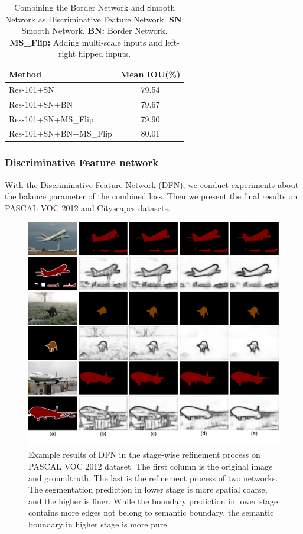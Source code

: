 \documentclass[10pt,twocolumn,letterpaper]{article}
\begin{document}
\begin{table}[t]
\begin{center}
\caption{Combining the Border Network and Smooth Network as Discriminative Feature Network. \textbf{SN}: Smooth Network. \textbf{BN:} Border Network. \textbf{MS\_Flip:} Adding multi-scale inputs and left-right flipped inputs.}
\label{tab:bn}
\begin{tabular}{lc}
\toprule
Method & Mean IOU(\%)\\
\hline
\noalign{\smallskip}
Res-101+SN & 79.54\\
Res-101+SN+BN & 79.67\\
\hline
\noalign{\smallskip}
Res-101+SN+MS\_Flip & 79.90\\
Res-101+SN+BN+MS\_Flip & 80.01\\
\bottomrule
\end{tabular}
\end{center}
\end{table}

\subsubsection{Discriminative Feature network}
With the Discriminative Feature Network (DFN), we conduct experiments about the balance parameter of the combined loss. Then we present the final results on PASCAL VOC 2012 and Cityscapes datasets.

\begin{figure}[t]
	\centering
	\includegraphics[width=\linewidth]{refine.pdf}
	\caption{Example results of DFN in the stage-wise refinement process on PASCAL VOC 2012 dataset. The first column is the original image and groundtruth. The last is the refinement process of two networks. The segmentation prediction in lower stage is more spatial coarse, and the higher is finer.  While the boundary prediction in lower stage contains more edges not belong to semantic boundary, the semantic boundary in higher stage is more pure.}
	\label{fig:refine}
\end{figure}
\end{document}
